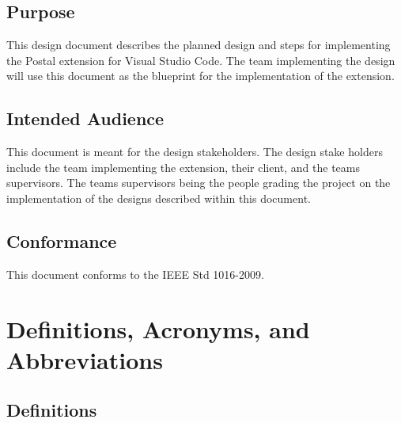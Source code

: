 \documentclass[letterpaper,10pt,titlepage,draftclsnofoot,onecolumn,onesided] {IEEEtran}
\begin{document}
\subsection{Purpose}
This design document describes the planned design and steps for implementing the Postal extension for Visual Studio Code. 
The team implementing the design will use this document as the blueprint for the implementation of the extension. 

\subsection{Intended Audience}
This document is meant for the design stakeholders. 
The design stake holders include the team implementing the extension, their client, and the teams supervisors. 
The teams supervisors being the people grading the project on the implementation of the designs described within this document.



\subsection{Conformance}
This document conforms to the IEEE Std 1016-2009.

\section{Definitions, Acronyms, and Abbreviations}

\subsection{Definitions}
\newtheorem{Model-View-Controller (MVC)}{A design pattern assigns objects in an application one of three roles: model, view, or controller. The pattern defines not only the roles objects play in the application, it defines the way objects communicate with each other. Each of the three types of objects is separated from the others by abstract boundaries and communicates with objects of the other types across those boundaries. The collection of objects of a certain MVC type in an application is sometimes referred to as a layer ��for example, model layer.\cite{appleMVC}}
\newtheorem{Integrated Development Environment}{A software application that provides comprehensive facilities to computer programmers for software development}
\newtheorem{dictionary}{An abstract data type composed of a collection of (key, value) pairs, such that each possible key appears at most once in the collection.}
\end{document}
